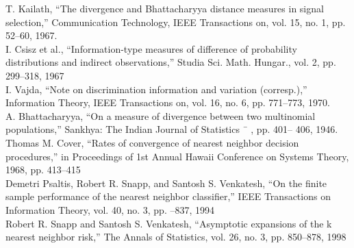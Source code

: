 \documentclass{article}
\begin{document}
	\noindent [30] T. Kailath, “The divergence and Bhattacharyya distance measures in signal selection,” Communication 
	\indent Technology, IEEE Transactions on,	vol. 15, no. 1, pp. 52–60, 1967.
	\\ [0.5ex]
	
	\noindent [31] I. Csisz et al., “Information-type measures of difference of probability	distributions and indirect 
	\indent observations,” Studia Sci. Math. Hungar.,
	vol. 2, pp. 299–318, 1967
	\\ [0.5ex]
	
	\noindent [32] I. Vajda, “Note on discrimination information and variation (corresp.),”	Information Theory, IEEE 
	\indent Transactions on, vol. 16, no. 6, pp. 771–773, 1970.
	\\ [0.5ex]
	
	\noindent [33] A. Bhattacharyya, “On a measure of divergence between two multinomial populations,” Sankhya: 
	\indent The Indian Journal of Statistics ¯ , pp. 401–
	406, 1946.
	\\[0.5 ex]
	
	\noindent [34] Thomas M. Cover, “Rates of convergence of nearest
	neighbor decision procedures,” in Proceedings \indent of 1st
	Annual Hawaii Conference on Systems Theory, 1968,
	pp. 413–415
	\indent
	\\[0.5ex]
	
	\noindent [35] Demetri Psaltis, Robert R. Snapp, and Santosh S.
	Venkatesh, “On the finite sample performance \indent of the
	nearest neighbor classifier,” IEEE Transactions on Information
	Theory, vol. 40, no. 3, pp. –837, 1994
	\\[0.5ex]
	
	\noindent [36] Robert R. Snapp and Santosh S. Venkatesh, “Asymptotic
	expansions of the k nearest neighbor \indent risk,” The
	Annals of Statistics, vol. 26, no. 3, pp. 850–878, 1998
	\\[0.5ex]
	
\end{document}
